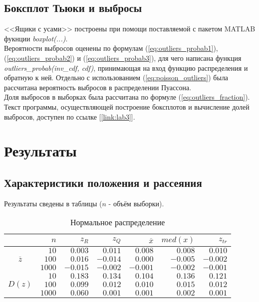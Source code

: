 \documentclass[zuev_report2.tex]{subfiles}
\begin{document}
\subsection{Боксплот Тьюки и выбросы}
<<Ящики с усами>> построены при помощи поставляемой с пакетом MATLAB фукнции \textit{boxplot(...)}.\\
Вероятности выбросов оценены по формулам (\ref{eq:outliers_probab1}), (\ref{eq:outliers_probab2}) и (\ref{eq:outliers_probab3}), для чего написана функция \textit{outliers\_probab(inv\_cdf, cdf)}, принимающая на вход функцию распределения и обратную к ней. Отдельно с использованием (\ref{eq:poisson_outliers}) была рассчитана вероятность выбросов в распределении Пуассона.\\
Доля выбросов в выборках была рассчитана по формуле (\ref{eq:outliers_fraction}).\\
Текст программы, осуществляющей построение боксплотов и вычисление долей выбросов, доступен по ссылке [\ref{link:lab3}].


\newpage
\section{Результаты}
\subsection{Характеристики положения и рассеяния}
Результаты сведены в таблицы ($n$ - объём выборки).
\begin{table}[H]
\centering
\caption{Нормальное распределение}
\begin{tabular}{c*6r}
\toprule
{} &         
$n$  & 
\centering $z_R$ & 
\centering $z_Q$ &
\centering $\overline{x}$& 
\centering $med(x)$ &
\centering $z_{tr}$ \tabularnewline
\midrule
\multirow{3}{*}{$\overline{z}$}
& $10$    & $ 0.003$  & $ 0.011$  & $ 0.008$  & $ 0.008$  & $ 0.010$ \\
& $100$   & $ 0.016$  & $-0.014$  & $ 0.000$  & $-0.005$  & $-0.002$ \\
& $1000$  & $-0.015$  & $-0.002$  & $-0.001$  & $-0.002$  & $-0.001$ \\
\midrule
\multirow{3}{*}{$D(z)$}
& $10$    & $0.183$  & $0.134$  & $0.104$  & $0.136$  & $0.121$ \\
& $100$   & $0.099$  & $0.012$  & $0.010$  & $0.015$  & $0.012$ \\
& $1000$  & $0.060$  & $0.001$  & $0.001$  & $0.002$  & $0.001$ \\              
\bottomrule
\end{tabular}
\label{table:norm}
\end{table}
\end{document}
